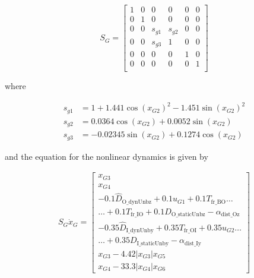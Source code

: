 \documentclass[letterpaper, 10 pt, conference]{ieeeconf}  %
\begin{document}
\begin{equation}
  S_G =     \begin{bmatrix}
    1 & 0 & 0      & 0      & 0 & 0 \\
    0 & 1 & 0      & 0      & 0 & 0 \\
    0 & 0 & s_{g1} & s_{g2} & 0 & 0 \\
    0 & 0 & s_{g3} & 1      & 0 & 0 \\
    0 & 0 & 0      & 0      & 1 & 0 \\
    0 & 0 & 0      & 0      & 0 & 1 \\
  \end{bmatrix}
\end{equation}

where 

\begin{equation}
  \begin{aligned}
    s_{g1} & = 1 + 1.441 \cos(x_{G2})^2 - 1.451 \sin(x_{G2})^2 \\
    s_{g2} & = 0.0364 \cos(x_{G2}) + 0.0052 \sin(x_{G2})       \\
    s_{g3} & = -0.02345 \sin(x_{G2}) + 0.1274 \cos(x_{G2})
  \end{aligned}
\end{equation}

and the equation for the nonlinear dynamics is given by

\begin{equation}
  \label{nonlinear state space}
  \begin{split}
    S_G \dot x_G =
    \begin{bmatrix}
      x_{G3}                                                                          \\
      x_{G4}                                                                          \\
      -0.1 \hat{D}_{\text{O\_dynUnbz}} + 0.1 u_{G1} + 0.1 T_{\text{fr\_BO}} \hdots    \\ \hdots + 0.1 T_{\text{fr\_IO}}  + 0.1 D_{\text{O\_staticUnbz}} - \alpha_{\text{dist\_Oz}} \\
      -0.35 \hat{D}_{\text{I\_dynUnby}} + 0.35 T_{\text{fr\_OI}} + 0.35 u_{G2} \hdots \\ \hdots + 0.35 D_{\text{I\_staticUnby}} - \alpha_{\text{dist\_Iy}}                     \\
      x_{G3} - 4.42 \lvert x_{G3} \rvert x_{G5}                                       \\
      x_{G4} - 33.3 \lvert x_{G4} \rvert x_{G6}
    \end{bmatrix}
  \end{split}
\end{equation}
\end{document}
